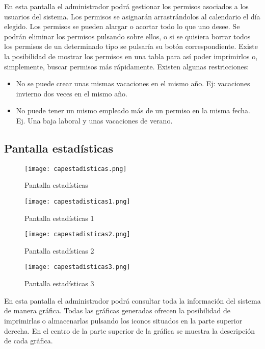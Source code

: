 En esta pantalla el administrador podrá gestionar los permisos asociados a los usuarios del sistema. Los permisos se asignarán arrastrándolos al calendario el día elegido. Los permisos se pueden alargar o acortar todo lo que uno desee. Se podrán eliminar los permisos pulsando sobre ellos, o si se quisiera borrar todos los permisos de un determinado tipo se pulsaría su botón correspondiente. Existe la posibilidad de mostrar los permisos en una tabla para así poder imprimirlos o, simplemente, buscar permisos más rápidamente. Existen algunas restricciones:
\begin{itemize}
\item No se puede crear unas mismas vacaciones en el mismo año. Ej: vacaciones invierno dos veces en el mismo año.
\item No puede tener un mismo empleado más de un permiso en la misma fecha. Ej. Una baja laboral y unas vacaciones de verano.
\end{itemize}

\newpage
\subsection {Pantalla estadísticas}

\begin{figure}[!htb]
  \centering
    \texttt{[image: capestadisticas.png]}
  \caption{Pantalla estadísticas}
  \label{a}
\end{figure}

\begin{figure}[!htb]
  \centering
    \texttt{[image: capestadisticas1.png]}
  \caption{Pantalla estadísticas 1}
  \label{a}
\end{figure}

\newpage
\begin{figure}[!htb]
  \centering
    \texttt{[image: capestadisticas2.png]}
  \caption{Pantalla estadísticas 2}
  \label{a}
\end{figure}

\begin{figure}[!htb]
  \centering
    \texttt{[image: capestadisticas3.png]}
  \caption{Pantalla estadísticas 3}
  \label{a}
\end{figure}
En esta pantalla el administrador podrá consultar toda la información del sistema de manera gráfica. Todas las gráficas generadas ofrecen la posibilidad de imprimirlas o almacenarlas pulsando los iconos situados en la parte superior derecha. En el centro de la parte superior de la gráfica se muestra la descripción de cada gráfica.